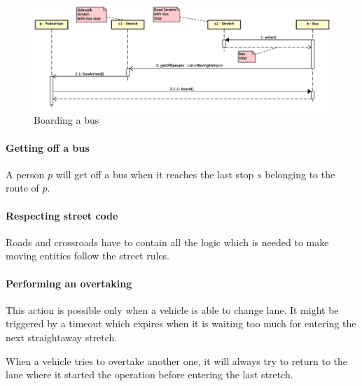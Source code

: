 \begin{figure}[H]
  \centering
  \includegraphics[width=\columnwidth,trim=1 0 0 0,clip]
    {images/solution/bus_boarding.eps}
  \caption{Boarding a bus}
  \label{fig:app-inter-board-bus}
\end{figure}

\paragraph{Getting off a bus} A person $p$ will get off a bus when it reaches
the last stop $s$ belonging to the route of $p$.

\paragraph{Respecting street code} Roads and crossroads have to contain
all the logic which is needed to make moving entities follow the street rules.

\paragraph{Performing an overtaking} This action is possible only when a
vehicle is able to change lane. It might be triggered by a timeout which
expires when it is waiting too much for entering the next straightaway stretch.

When a vehicle tries to overtake another one, it will always try to return to
the lane where it started the operation before entering the last stretch.

